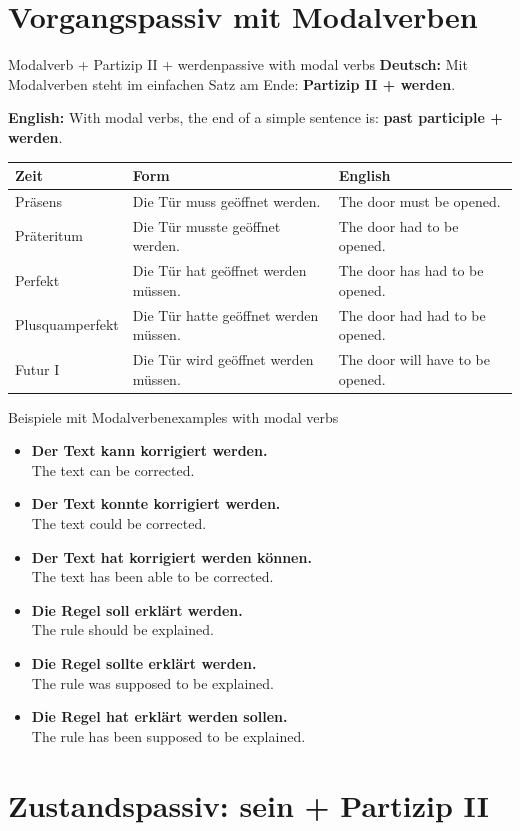 \documentclass[a4paper,11pt]{article}
\newcommand{\GermanText}[1]{\textbf{Deutsch: }#1\par}
\newcommand{\EnglishText}[1]{{\small\color{SoftGray}\textbf{English: }#1\par}}
\newcommand{\ExampleItem}[2]{\item \textbf{#1}\\{\small\color{SoftGray}#2}}
\begin{document}
\section{Vorgangspassiv mit Modalverben}

\begin{grammarentry}{Modalverb + Partizip II + werden}{passive with modal verbs}
\GermanText{Mit Modalverben steht im einfachen Satz am Ende: \textbf{Partizip II + werden}.}
\EnglishText{With modal verbs, the end of a simple sentence is: \textbf{past participle + werden}.}

\begin{center}
\begin{tabular}{lll}
\textbf{Zeit} & \textbf{Form} & \textbf{English} \\
\hline
Präsens & Die Tür muss geöffnet werden. & The door must be opened. \\
Präteritum & Die Tür musste geöffnet werden. & The door had to be opened. \\
Perfekt & Die Tür hat geöffnet werden müssen. & The door has had to be opened. \\
Plusquamperfekt & Die Tür hatte geöffnet werden müssen. & The door had had to be opened. \\
Futur I & Die Tür wird geöffnet werden müssen. & The door will have to be opened. \\
\end{tabular}
\end{center}
\end{grammarentry}

\begin{grammarentry}{Beispiele mit Modalverben}{examples with modal verbs}
\begin{exbox}
\begin{itemize}
    \ExampleItem{Der Text kann korrigiert werden.}{The text can be corrected.}
    \ExampleItem{Der Text konnte korrigiert werden.}{The text could be corrected.}
    \ExampleItem{Der Text hat korrigiert werden können.}{The text has been able to be corrected.}
    \ExampleItem{Die Regel soll erklärt werden.}{The rule should be explained.}
    \ExampleItem{Die Regel sollte erklärt werden.}{The rule was supposed to be explained.}
    \ExampleItem{Die Regel hat erklärt werden sollen.}{The rule has been supposed to be explained.}
\end{itemize}
\end{exbox}
\end{grammarentry}

\section{Zustandspassiv: sein + Partizip II}
\end{document}
